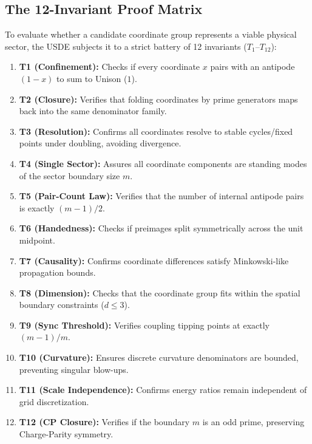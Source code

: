 \documentclass[11pt,a4paper]{article}
\begin{document}
\subsection{The 12-Invariant Proof Matrix}
To evaluate whether a candidate coordinate group represents a viable physical sector, the USDE subjects it to a strict battery of 12 invariants ($T_1$--$T_{12}$):
\begin{enumerate}
    \item \textbf{T1 (Confinement):} Checks if every coordinate $x$ pairs with an antipode $(1-x)$ to sum to Unison ($1$).
    \item \textbf{T2 (Closure):} Verifies that folding coordinates by prime generators maps back into the same denominator family.
    \item \textbf{T3 (Resolution):} Confirms all coordinates resolve to stable cycles/fixed points under doubling, avoiding divergence.
    \item \textbf{T4 (Single Sector):} Assures all coordinate components are standing modes of the sector boundary size $m$.
    \item \textbf{T5 (Pair-Count Law):} Verifies that the number of internal antipode pairs is exactly $(m-1)/2$.
    \item \textbf{T6 (Handedness):} Checks if preimages split symmetrically across the unit midpoint.
    \item \textbf{T7 (Causality):} Confirms coordinate differences satisfy Minkowski-like propagation bounds.
    \item \textbf{T8 (Dimension):} Checks that the coordinate group fits within the spatial boundary constraints ($d \le 3$).
    \item \textbf{T9 (Sync Threshold):} Verifies coupling tipping points at exactly $(m-1)/m$.
    \item \textbf{T10 (Curvature):} Ensures discrete curvature denominators are bounded, preventing singular blow-ups.
    \item \textbf{T11 (Scale Independence):} Confirms energy ratios remain independent of grid discretization.
    \item \textbf{T12 (CP Closure):} Verifies if the boundary $m$ is an odd prime, preserving Charge-Parity symmetry.
\end{enumerate}
\end{document}
